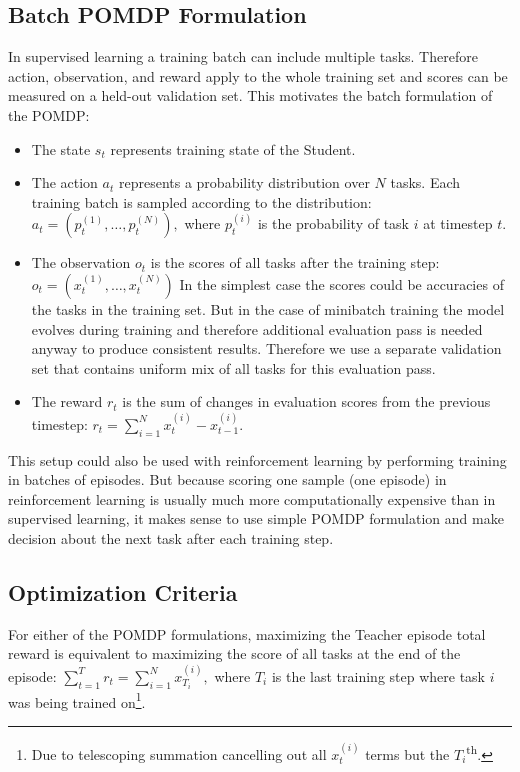 \documentclass{article}
\begin{document}
\subsection{Batch POMDP Formulation}
\label{ssec22}

In supervised learning a training batch can include multiple tasks. Therefore action, observation, and reward apply to the whole training set and scores can be measured on a held-out validation set. This motivates the batch formulation of the POMDP:
\begin{itemize}
\item  The state $s_t$ represents training state of the Student.

\item  The action $a_t$ represents a probability distribution over $N$ tasks. Each training batch is sampled according to the distribution:
$
 a_t=(p^{(1)}_t,\ldots, p^{(N)}_t),
$
where $p^{(i)}_t$ is the probability of task $i$ at timestep $t$.

\item  The observation $o_t$ is the scores of all tasks after the training step:
$
o_t=(x^{(1)}_t,\ldots ,x^{(N)}_t)
$
In the simplest case the scores could be accuracies of the tasks in the training set. But in the case of minibatch training the model evolves during training and therefore additional evaluation pass is needed anyway to produce consistent results. Therefore we use a separate validation set that contains uniform mix of all tasks for this evaluation pass.

\item  The reward $r_t$ is the sum of changes in evaluation scores from the previous timestep:
$
r_t=\sum^N_{i=1}x^{(i)}_t-x^{(i)}_{t-1}
$.

\end{itemize}

This setup could also be used with reinforcement learning by performing training in batches of episodes. But because scoring one sample (one episode) in reinforcement learning is usually much more computationally expensive than in supervised learning, it makes sense to use simple POMDP formulation and make decision about the next task after each training step.

\subsection{Optimization Criteria}

For either of the POMDP formulations, maximizing the Teacher episode total reward is equivalent to maximizing the score of all tasks at the end of the episode:
$
\sum^T_{t=1}{}r_t=
\sum^N_{i=1}{}x^{(i)}_{T_i},
$
where $T_i$ is the last training step where task $i$ was being trained on\footnote{Due to telescoping summation cancelling out all $x_t^{(i)}$ terms but the $T_i$\textsuperscript{th}.}.
\end{document}
